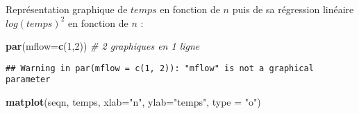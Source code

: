 \documentclass[
]{article}
\newenvironment{Shaded}{\begin{snugshade}}{\end{snugshade}}
\newcommand{\CommentTok}[1]{\textcolor[rgb]{0.56,0.35,0.01}{\textit{#1}}}
\newcommand{\ControlFlowTok}[1]{\textcolor[rgb]{0.13,0.29,0.53}{\textbf{#1}}}
\newcommand{\DataTypeTok}[1]{\textcolor[rgb]{0.13,0.29,0.53}{#1}}
\newcommand{\DecValTok}[1]{\textcolor[rgb]{0.00,0.00,0.81}{#1}}
\newcommand{\KeywordTok}[1]{\textcolor[rgb]{0.13,0.29,0.53}{\textbf{#1}}}
\newcommand{\NormalTok}[1]{#1}
\newcommand{\OperatorTok}[1]{\textcolor[rgb]{0.81,0.36,0.00}{\textbf{#1}}}
\newcommand{\StringTok}[1]{\textcolor[rgb]{0.31,0.60,0.02}{#1}}
\begin{document}
\begin{Shaded}
\end{Shaded}

Représentation graphique de \(temps\) en fonction de \(n\) puis de sa
régression linéaire \(log(temps)^2\) en fonction de \(n\) :

\begin{Shaded}
\begin{Highlighting}[]
\KeywordTok{par}\NormalTok{(}\DataTypeTok{mflow=}\KeywordTok{c}\NormalTok{(}\DecValTok{1}\NormalTok{,}\DecValTok{2}\NormalTok{)) }\CommentTok{# 2 graphiques en 1 ligne}
\end{Highlighting}
\end{Shaded}

\begin{verbatim}
## Warning in par(mflow = c(1, 2)): "mflow" is not a graphical parameter
\end{verbatim}

\begin{Shaded}
\begin{Highlighting}[]
\KeywordTok{matplot}\NormalTok{(seqn, temps, }\DataTypeTok{xlab=}\StringTok{"n"}\NormalTok{, }\DataTypeTok{ylab=}\StringTok{"temps"}\NormalTok{, }\DataTypeTok{type =} \StringTok{"o"}\NormalTok{)}
\end{Highlighting}
\end{Shaded}
\end{document}
